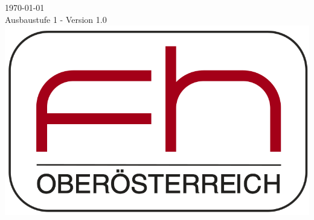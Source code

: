 \documentclass[12pt, letterpaper]{article}
\begin{document}
\begin{titlepage}


{\large \today}\\[1cm] %
{Ausbaustufe 1 -}
{Version 1.0}\\[2cm]

\includegraphics[scale=0.25]{logo.png}
 

\vfill %

\end{titlepage}


\tableofcontents





\end{document}
